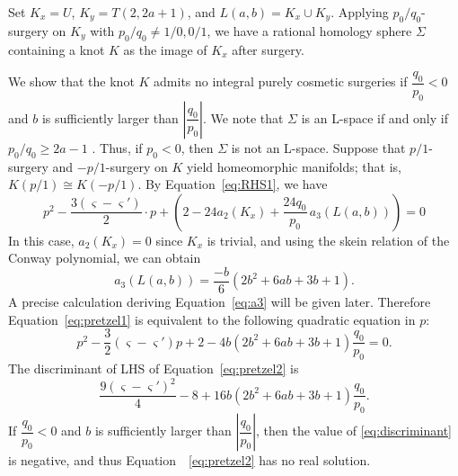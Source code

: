 \documentclass{amsart}
\theoremstyle{remark}
\begin{document}
Set $K_x = U$, $K_y = T(2,2a+1)$, and $L(a,b) = K_x \cup K_y$. 
Applying $p_0/q_0$-surgery on $K_y$ with $p_0/q_0 \ne 1/0, 0/1$, we have a rational homology sphere $\Sigma$ containing a knot $K$ as the image of $K_x$ after surgery. 

We show that the knot $K$ admits no integral purely cosmetic surgeries if $\dfrac{q_0}{p_0}<0$ and $b$ is sufficiently larger than $\left| \dfrac{q_0}{p_0} \right|$.  
We note that 
$\Sigma$ is an L-space if and only if $p_0/q_0 \ge 2a -1$ \cite[Example 1.6]{MotegiTeragaito14}. 
Thus, if $p_0 <0$, then $\Sigma$ is not an L-space. 
Suppose that $p/1$-surgery and $-p/1$-surgery on $K$ yield homeomorphic manifolds; that is, $K(p/1) \cong K(-p/1)$. 
By Equation~\eqref{eq:RHS1}, we have 
\begin{equation}\label{eq:pretzel1}
p^2 - \frac{3(\varsigma - \varsigma')}{2}\cdot p  + \left( 2 - 24 a_2(K_x) + \frac{24  q_0}{p_0} \,a_3(L(a,b)) \right) =0 
\end{equation}
In this case, $a_2(K_x) = 0$ since $K_x$ is trivial, and using the skein relation of the Conway polynomial, we can obtain 
\begin{equation}\label{eq:a3}
    a_3\left(L(a,b)\right) = \dfrac{-b}{6}\left( 2b^2 + 6ab + 3b +1 \right) .
\end{equation}
A precise calculation deriving Equation~\eqref{eq:a3} will be given later. 
Therefore Equation~\eqref{eq:pretzel1} is equivalent to the following quadratic equation in $p$: 
\begin{equation}\label{eq:pretzel2}
    p^2 - \dfrac{3}{2}( \varsigma - \varsigma' ) p + 2 - 4b\left( 2b^2 + 6ab + 3b +1 \right) \dfrac{q_0}{p_0} = 0. 
\end{equation}
The discriminant of LHS of Equation~\eqref{eq:pretzel2} is 
\begin{equation}\label{eq:discriminant}
    \dfrac{9(\varsigma - \varsigma')^2}{4} - 8 + 16b(2b^2 + 6ab + 3b +1) \dfrac{q_0}{p_0}. 
\end{equation}
If $\dfrac{q_0}{p_0}<0$ and $b$ is sufficiently larger than $\left| \dfrac{q_0}{p_0} \right|$, then the value of \eqref{eq:discriminant} is negative, and thus Equation~~\eqref{eq:pretzel2} has no real solution. 
\end{document}
